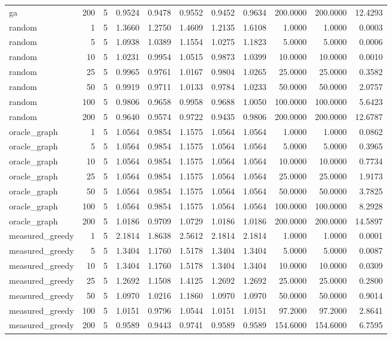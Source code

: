 \begin{table}[t]
\begin{tabular}{lrrrrrrrrrr}
ga & 200 & 5 & 0.9524 & 0.9478 & 0.9552 & 0.9452 & 0.9634 & 200.0000 & 200.0000 & 12.4293 \\
random & 1 & 5 & 1.3660 & 1.2750 & 1.4609 & 1.2135 & 1.6108 & 1.0000 & 1.0000 & 0.0003 \\
random & 5 & 5 & 1.0938 & 1.0389 & 1.1554 & 1.0275 & 1.1823 & 5.0000 & 5.0000 & 0.0006 \\
random & 10 & 5 & 1.0231 & 0.9954 & 1.0515 & 0.9873 & 1.0399 & 10.0000 & 10.0000 & 0.0010 \\
random & 25 & 5 & 0.9965 & 0.9761 & 1.0167 & 0.9804 & 1.0265 & 25.0000 & 25.0000 & 0.3582 \\
random & 50 & 5 & 0.9919 & 0.9711 & 1.0133 & 0.9784 & 1.0233 & 50.0000 & 50.0000 & 2.0757 \\
random & 100 & 5 & 0.9806 & 0.9658 & 0.9958 & 0.9688 & 1.0050 & 100.0000 & 100.0000 & 5.6423 \\
random & 200 & 5 & 0.9640 & 0.9574 & 0.9722 & 0.9435 & 0.9806 & 200.0000 & 200.0000 & 12.6787 \\
oracle\_graph & 1 & 5 & 1.0564 & 0.9854 & 1.1575 & 1.0564 & 1.0564 & 1.0000 & 1.0000 & 0.0862 \\
oracle\_graph & 5 & 5 & 1.0564 & 0.9854 & 1.1575 & 1.0564 & 1.0564 & 5.0000 & 5.0000 & 0.3965 \\
oracle\_graph & 10 & 5 & 1.0564 & 0.9854 & 1.1575 & 1.0564 & 1.0564 & 10.0000 & 10.0000 & 0.7734 \\
oracle\_graph & 25 & 5 & 1.0564 & 0.9854 & 1.1575 & 1.0564 & 1.0564 & 25.0000 & 25.0000 & 1.9173 \\
oracle\_graph & 50 & 5 & 1.0564 & 0.9854 & 1.1575 & 1.0564 & 1.0564 & 50.0000 & 50.0000 & 3.7825 \\
oracle\_graph & 100 & 5 & 1.0564 & 0.9854 & 1.1575 & 1.0564 & 1.0564 & 100.0000 & 100.0000 & 8.2928 \\
oracle\_graph & 200 & 5 & 1.0186 & 0.9709 & 1.0729 & 1.0186 & 1.0186 & 200.0000 & 200.0000 & 14.5897 \\
measured\_greedy & 1 & 5 & 2.1814 & 1.8638 & 2.5612 & 2.1814 & 2.1814 & 1.0000 & 1.0000 & 0.0001 \\
measured\_greedy & 5 & 5 & 1.3404 & 1.1760 & 1.5178 & 1.3404 & 1.3404 & 5.0000 & 5.0000 & 0.0087 \\
measured\_greedy & 10 & 5 & 1.3404 & 1.1760 & 1.5178 & 1.3404 & 1.3404 & 10.0000 & 10.0000 & 0.0309 \\
measured\_greedy & 25 & 5 & 1.2692 & 1.1508 & 1.4125 & 1.2692 & 1.2692 & 25.0000 & 25.0000 & 0.2800 \\
measured\_greedy & 50 & 5 & 1.0970 & 1.0216 & 1.1860 & 1.0970 & 1.0970 & 50.0000 & 50.0000 & 0.9014 \\
measured\_greedy & 100 & 5 & 1.0151 & 0.9796 & 1.0544 & 1.0151 & 1.0151 & 97.2000 & 97.2000 & 2.8641 \\
measured\_greedy & 200 & 5 & 0.9589 & 0.9443 & 0.9741 & 0.9589 & 0.9589 & 154.6000 & 154.6000 & 6.7595 \\
\bottomrule
\end{tabular}
\end{table}
